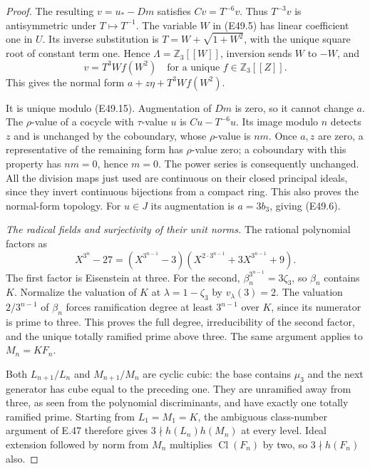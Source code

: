 \begin{proof}
The resulting
$v=u_*-Dm$ satisfies
$Cv=T^{-6}v$. Thus $T^{-3}v$
is antisymmetric under $T\mapsto T^{-1}$.
The variable $W$ in (E49.5) has
linear coefficient one in $U$.
Its inverse substitution is
$T=W+\sqrt{1+W^2}$, with the
unique square root of constant
term one. Hence
$\Lambda=\mathbb Z_3[[W]]$, inversion
sends $W$ to $-W$, and
\[
              v=T^3W f(W^2)
                    \quad\text{for a unique }f\in\mathbb Z_3[[Z]].
 \tag{E49.18}
\]
This gives the normal form
$a+z\eta+T^3W f(W^2)$.

It is unique modulo (E49.15).
Augmentation of $Dm$ is zero, so
it cannot change $a$. The
$\rho$-value of a cocycle with
$\tau$-value $u$ is
$Cu-T^{-6}u$. Its image modulo
$n$ detects $z$ and is unchanged
by the coboundary, whose
$\rho$-value is $nm$. Once $a,z$
are zero, a representative of
the remaining form has
$\rho$-value zero; a coboundary
with this property has $nm=0$,
hence $m=0$. The power series
is consequently unchanged.
All the division maps just used
are continuous on their closed
principal ideals, since they
invert continuous bijections
from a compact ring. This also
proves the normal-form topology.
For $u\in J$ its augmentation
is $a=3b_3$, giving (E49.6).

\emph{The radical fields and surjectivity of their unit norms.}
The rational polynomial factors as
\[
 X^{3^n}-27
  =(X^{3^{n-1}}-3)
       (X^{2\cdot3^{n-1}}+3X^{3^{n-1}}+9).
 \tag{E49.19}
\]
The first factor is Eisenstein at
three. For the second,
$\beta_n^{3^{n-1}}=3\zeta_3$,
so $\beta_n$ contains $K$.
Normalize the valuation of $K$
at $\lambda=1-\zeta_3$ by
$v_\lambda(3)=2$.
The valuation $2/3^{n-1}$ of
$\beta_n$ forces ramification
degree at least $3^{n-1}$ over
$K$, since its numerator is
prime to three. This proves
the full degree, irreducibility
of the second factor, and the
unique totally ramified prime
above three. The same argument
applies to $M_n=K F_n$.

Both $L_{n+1}/L_n$ and
$M_{n+1}/M_n$ are cyclic cubic:
the base contains $\mu_3$ and
the next generator has cube
equal to the preceding one.
They are unramified away from
three, as seen from the
polynomial discriminants,
and have exactly one totally
ramified prime. Starting from
$L_1=M_1=K$, the ambiguous
class-number argument of E.47
therefore gives
$3\nmid h(L_n)h(M_n)$ at every
level. Ideal extension followed
by norm from $M_n$ multiplies
$\operatorname{Cl}(F_n)$ by
two, so $3\nmid h(F_n)$ also.


\end{proof}
